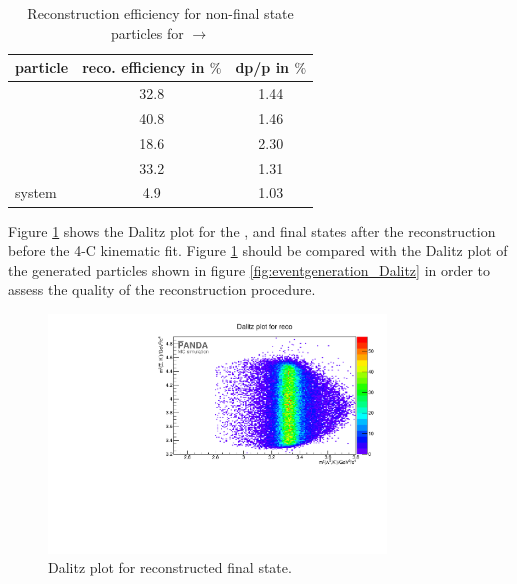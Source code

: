 		\begin{table}
		\centering
		\caption{\propose Reconstruction efficiency for non-final state particles for \pbarpSystem $\rightarrow$ \excitedanticascade \cascade}
		\label{tab:non-finalstate_efficiency_cc}
		
		\begin{tabular}{lcc}
		
			\hline
			particle & reco. efficiency in $\%$ & dp/p in $\%$ \\\hline
			\hline
			\lam & 32.8 &   1.44 \\
			\alam & 40.8 &   1.46\\
			\cascade & 18.6&   2.30\\
			\excitedanticascade & 33.2&   1.31\\
			\excitedanticascade \cascade system & 4.9&   1.03\\\hline
			 	
		\end{tabular}
	\end{table}
	
	Figure \ref{fig:reco_Dalitzplot} shows the Dalitz plot for the \anticascade, \lam and \kminus final states after the reconstruction before the 4-C kinematic fit. 
	Figure \ref{fig:reco_Dalitzplot} should be compared with the Dalitz plot of the generated particles shown in figure \ref{fig:eventgeneration_Dalitz}
	in order to assess the quality of the reconstruction procedure.
	
	\begin{figure}
		\centering
		\includegraphics[width=0.8\textwidth]{./plots/pbarp/Dalitzplot_reco.pdf}
		\caption{\propose Dalitz plot for reconstructed \anticascade\lam\kminus final state.}
		\label{fig:reco_Dalitzplot}
	
	\end{figure}
	
	